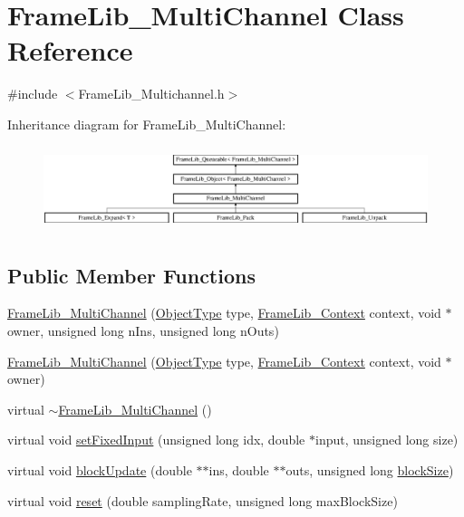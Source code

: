 \hypertarget{class_frame_lib___multi_channel}{}\section{Frame\+Lib\+\_\+\+Multi\+Channel Class Reference}
\label{class_frame_lib___multi_channel}


{\ttfamily \#include $<$Frame\+Lib\+\_\+\+Multichannel.\+h$>$}

Inheritance diagram for Frame\+Lib\+\_\+\+Multi\+Channel\+:\begin{figure}[H]
\begin{center}
\leavevmode
\includegraphics[height=2.488889cm]{class_frame_lib___multi_channel}
\end{center}
\end{figure}
\subsection*{Public Member Functions}
\begin{DoxyCompactItemize}
\item 
\hyperlink{class_frame_lib___multi_channel_aa16395513324c73e7be8d1d8a5db87e7}{Frame\+Lib\+\_\+\+Multi\+Channel} (\hyperlink{_frame_lib___types_8h_a842c5e2e69277690b064bf363c017980}{Object\+Type} type, \hyperlink{class_frame_lib___context}{Frame\+Lib\+\_\+\+Context} context, void $\ast$owner, unsigned long n\+Ins, unsigned long n\+Outs)
\item 
\hyperlink{class_frame_lib___multi_channel_aa336f53f31444970053d7a28f97c2c9a}{Frame\+Lib\+\_\+\+Multi\+Channel} (\hyperlink{_frame_lib___types_8h_a842c5e2e69277690b064bf363c017980}{Object\+Type} type, \hyperlink{class_frame_lib___context}{Frame\+Lib\+\_\+\+Context} context, void $\ast$owner)
\item 
virtual \hyperlink{class_frame_lib___multi_channel_ab6c1272cacfc7bf3cad1e2430d4c7020}{$\sim$\+Frame\+Lib\+\_\+\+Multi\+Channel} ()
\item 
virtual void \hyperlink{class_frame_lib___multi_channel_a2bbd1050ff53556bf671282312857301}{set\+Fixed\+Input} (unsigned long idx, double $\ast$input, unsigned long size)
\item 
virtual void \hyperlink{class_frame_lib___multi_channel_a8ad8f1c0138f32ef0bfb7e4673b34d30}{block\+Update} (double $\ast$$\ast$ins, double $\ast$$\ast$outs, unsigned long \hyperlink{_frame_lib___memory_8cpp_a8ef7d53a4cac28bf580a61f265fcaaa6}{block\+Size})
\item 
virtual void \hyperlink{class_frame_lib___multi_channel_af27f3dca507c48459452be825b4c0c72}{reset} (double sampling\+Rate, unsigned long max\+Block\+Size)
\end{DoxyCompactItemize}
